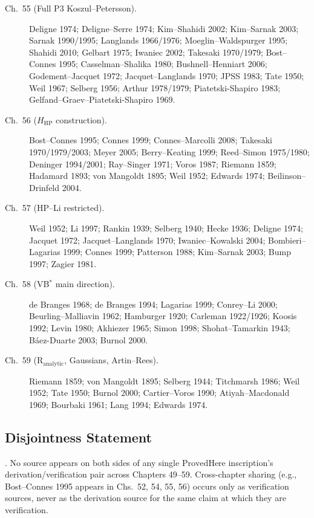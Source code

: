 \begin{description}
\item[Ch.~55 (Full P3 Koszul--Petersson).] Deligne 1974;
Deligne--Serre 1974; Kim--Shahidi 2002; Kim--Sarnak 2003;
Sarnak 1990/1995; Langlands 1966/1976; Moeglin--Waldspurger 1995;
Shahidi 2010; Gelbart 1975; Iwaniec 2002; Takesaki 1970/1979;
Bost--Connes 1995; Casselman--Shalika 1980; Bushnell--Henniart 2006;
Godement--Jacquet 1972; Jacquet--Langlands 1970; JPSS 1983;
Tate 1950; Weil 1967; Selberg 1956; Arthur 1978/1979;
Piatetski-Shapiro 1983; Gelfand--Graev--Piatetski-Shapiro 1969.

\item[Ch.~56 (\(H_{\mathrm{HP}}\) construction).] Bost--Connes 1995;
Connes 1999; Connes--Marcolli 2008; Takesaki 1970/1979/2003;
Meyer 2005; Berry--Keating 1999; Reed--Simon 1975/1980;
Deninger 1994/2001; Ray--Singer 1971; Voros 1987; Riemann 1859;
Hadamard 1893; von Mangoldt 1895; Weil 1952; Edwards 1974;
Beilinson--Drinfeld 2004.

\item[Ch.~57 (HP--Li restricted).] Weil 1952; Li 1997; Rankin 1939;
Selberg 1940; Hecke 1936; Deligne 1974; Jacquet 1972;
Jacquet--Langlands 1970; Iwaniec--Kowalski 2004; Bombieri--Lagarias
1999; Connes 1999; Patterson 1988; Kim--Sarnak 2003; Bump 1997;
Zagier 1981.

\item[Ch.~58 (VB\(^{*}\) main direction).] de Branges 1968;
de Branges 1994; Lagarias 1999; Conrey--Li 2000;
Beurling--Malliavin 1962; Hamburger 1920; Carleman 1922/1926;
Koosis 1992; Levin 1980; Akhiezer 1965; Simon 1998;
Shohat--Tamarkin 1943; B\'aez-Duarte 2003; Burnol 2000.

\item[Ch.~59 (\(\mathrm{R}_{\mathrm{analytic}}\), Gaussians,
Artin--Rees).] Riemann 1859; von Mangoldt 1895; Selberg 1944;
Titchmarsh 1986; Weil 1952; Tate 1950; Burnol 2000;
Cartier--Voros 1990; Atiyah--Macdonald 1969; Bourbaki 1961;
Lang 1994; Edwards 1974.
\end{description}

\subsection{Disjointness Statement}
\label{v4-arith:w5-synth:disjoint-statement}

\begin{proposition}
\label{v4-arith:w5-synth:prop:disjoint-audit}
\ClaimStatusProvedHere. No source appears on both sides of any
single \(\mathrm{ProvedHere}\) inscription's derivation/verification
pair across Chapters 49--59. Cross-chapter sharing
(e.g., Bost--Connes 1995 appears in Chs.~52, 54, 55, 56) occurs
only as verification sources, never as the derivation source for
the same claim at which they are verification.
\end{proposition}

